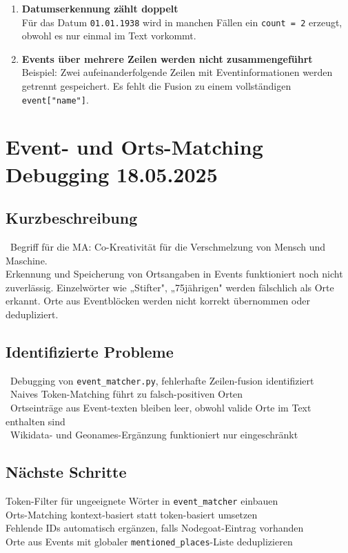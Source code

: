 \documentclass{article}
\begin{document}
\begin{enumerate}
    \item \textbf{Datumserkennung zählt doppelt}\\
    Für das Datum \texttt{01.01.1938} wird in manchen Fällen ein \texttt{count = 2} erzeugt, obwohl es nur einmal im Text vorkommt.
    
    \item \textbf{Events über mehrere Zeilen werden nicht zusammengeführt}\\
    Beispiel: Zwei aufeinanderfolgende Zeilen mit Eventinformationen werden getrennt gespeichert. Es fehlt die Fusion zu einem vollständigen \texttt{event["name"]}.
\end{enumerate}


\section{Event- und Orts-Matching Debugging \small 18.05.2025}

\subsection*{Kurzbeschreibung}

\faExclamationTriangle\ Begriff für die MA: Co-Kreativität für die Verschmelzung von Mensch und Maschine.\\
Erkennung und Speicherung von Ortsangaben in Events funktioniert noch nicht zuverlässig. Einzelwörter wie „Stifter", „75jährigen" werden fälschlich als Orte erkannt. Orte aus Eventblöcken werden nicht korrekt übernommen oder dedupliziert.

\subsection*{Identifizierte Probleme}
\faExclamationTriangle\ Debugging von \texttt{event\_matcher.py}, fehlerhafte Zeilen-fusion identifiziert\\
\faExclamationTriangle\ Naives Token-Matching führt zu falsch-positiven Orten\\
\faExclamationTriangle\ Ortseinträge aus Event-texten bleiben leer, obwohl valide Orte im Text enthalten sind\\
\faExclamationTriangle\ Wikidata- und Geonames-Ergänzung funktioniert nur eingeschränkt

\subsection*{Nächste Schritte}
 Token-Filter für ungeeignete Wörter in \texttt{event\_matcher} einbauen\\
 Orts-Matching kontext-basiert statt token-basiert umsetzen\\
 Fehlende IDs automatisch ergänzen, falls Nodegoat-Eintrag vorhanden\\
 Orte aus Events mit globaler \texttt{mentioned\_places}-Liste deduplizieren
\end{document}
